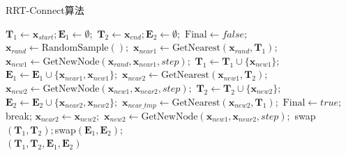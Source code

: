 \begin{algorithm}
    \caption{RRT-Connect算法}
    \label{RRT-Connect算法}
    \begin{algorithmic}[1]
        \setlength{\baselineskip}{16pt}
        \State $\boldsymbol{T}_1\leftarrow\boldsymbol{x}_{start};\boldsymbol{E}_1\leftarrow\emptyset;$
        \State $\boldsymbol{T}_2\leftarrow\boldsymbol{x}_{end};\boldsymbol{E}_2\leftarrow\emptyset;$
        \State $\text{Final} \gets false ;$
            \State $\boldsymbol{x}_{rand}\gets\text{RandomSample}();$
            \State $\boldsymbol{x}_{near1}\gets\text{GetNearest}(\boldsymbol{x}_{rand},\boldsymbol{T}_1);$
            \State $\boldsymbol{x}_{new1}\gets\text{GetNewNode}(\boldsymbol{x}_{rand},\boldsymbol{x}_{near1},step);$
                \State $\boldsymbol{T}_1\leftarrow \boldsymbol{T}_1\cup\{\boldsymbol{x}_{new1}\};$
                $\boldsymbol{E}_1\leftarrow \boldsymbol{E}_1\cup\{\boldsymbol{x}_{near1},\boldsymbol{x}_{new1}\};$
                \State $\boldsymbol{x}_{near2}\gets\text{GetNearest}(\boldsymbol{x}_{new1},\boldsymbol{T}_2);$
                \State $\boldsymbol{x}_{new2}\gets\text{GetNewNode}(\boldsymbol{x}_{new1},\boldsymbol{x}_{near2},step);$
                \State $\boldsymbol{T}_2\leftarrow \boldsymbol{T}_2\cup\{\boldsymbol{x}_{new2}\};$
                $\boldsymbol{E}_2\leftarrow \boldsymbol{E}_2\cup\{\boldsymbol{x}_{near2},\boldsymbol{x}_{new2}\};$
                \State $\boldsymbol{x}_{near\_tmp}\gets\text{GetNearest}(\boldsymbol{x}_{new2},\boldsymbol{T}_1);$
                    \State $\text{Final} \gets true ;$
                    \State break;
                \EndIf
                \State $\boldsymbol{x}_{near2}\gets\boldsymbol{x}_{new2};$
                \State $\boldsymbol{x}_{new2}\gets\text{GetNewNode}(\boldsymbol{x}_{new1},\boldsymbol{x}_{near2},step);$
                \EndWhile
                \State swap$(\boldsymbol{T}_1,\boldsymbol{T}_2);$swap$(\boldsymbol{E}_1,\boldsymbol{E}_2);$
            \EndIf
        \EndWhile \\
        \Return $(\boldsymbol{T}_1,\boldsymbol{T}_2,\boldsymbol{E}_1,\boldsymbol{E}_2)$
\end{algorithmic}
\end{algorithm}